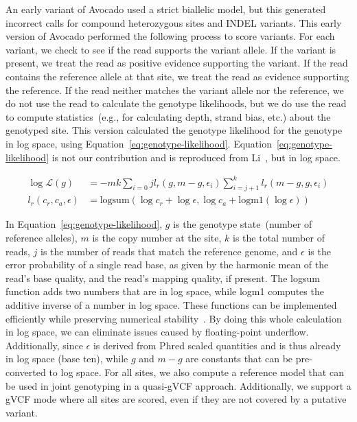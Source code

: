 \documentclass[phd]{ucbthesis}
\begin{document}
An early variant of {Avocado} used a strict biallelic model, but this
generated incorrect calls for compound heterozygous sites and INDEL variants.
This early version of {Avocado} performed the following process to score variants.
For each variant, we check to see if the read supports the variant allele.
If the variant is present, we treat the read as positive
evidence supporting the variant. If the read contains the reference allele at
that site, we treat the read as evidence supporting the reference. If the read
neither matches the variant allele nor the reference, we do not use the read
to calculate the genotype likelihoods, but we do use the read to compute
statistics~(e.g., for calculating depth, strand bias, etc.) about the genotyped
site. This version calculated the genotype likelihood for the genotype in log space,
using Equation~\eqref{eq:genotype-likelihood}. Equation~\eqref{eq:genotype-likelihood}
is not our contribution and is reproduced from Li~\cite{li11}, but in log space.

\begin{align}
\label{eq:genotype-likelihood}
\log \mathcal{L}(g) &= -m k \sum_{i = 0}{j} l_r(g, m - g, \epsilon_i) \sum_{i = j + 1}^k l_r(m - g, g, \epsilon_i) \\
l_r(c_r, c_a, \epsilon) &= \text{logsum}(\log c_r + \log \epsilon, \log c_a + \text{logm1}(\log \epsilon))
\end{align}

In Equation~\eqref{eq:genotype-likelihood}, $g$ is the genotype state~(number of
reference alleles), $m$ is the copy number at the site, $k$ is the total number of
reads, $j$ is the number of reads that match the reference genome, and $\epsilon$
is the error probability of a single read base, as given by the harmonic mean of the
read's base quality, and the read's mapping quality, if present. The logsum function
adds two numbers that are in log space, while logm1 computes the additive inverse of
a number in log space. These functions can be implemented efficiently while preserving
numerical stability~\cite{durbin98}. By doing this whole calculation in log space,
we can eliminate issues caused by floating-point underflow. Additionally, since
$\epsilon$ is derived from Phred scaled quantities and is thus already in log
space (base ten), while $g$ and $m - g$ are constants that can be pre-converted to
log space. For all sites, we also compute a reference model that can be used in
joint genotyping in a quasi-gVCF approach. Additionally, we support a gVCF mode where
all sites are scored, even if they are not covered by a putative variant.
\end{document}
